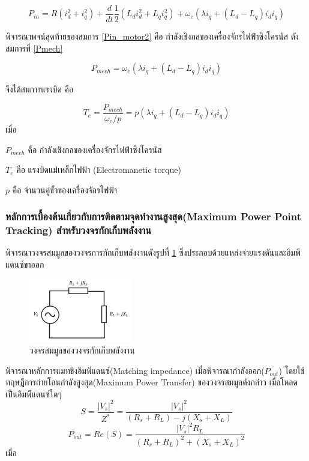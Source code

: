 \documentclass[11pt,a4paper]{article}
\begin{document}
\begin{equation}\label{Pin_motor2}
    P_{in} = R(i_{d}^2 +i_{q}^2) + \frac{d}{dt} \frac{1}{2} (L_{d}i_{d}^2 + L_{q}i_{q}^2) + \omega_{e}(\lambda i_{q} + (L_{d} - L_{q})i_{d}i_{q} )
\end{equation}

พิจารณาพจน์สุดท้ายของสมการ \ref{Pin_motor2} คือ กำลังเชิงกลของเครื่องจักรไฟฟ้าซิงโครนัส ดังสมการที่ \ref{Pmech}

\begin{equation}\label{Pmech}
    P_{mech} =  \omega_{e}(\lambda i_{q} + (L_{d} - L_{q})i_{d}i_{q} )
\end{equation}

จึงได้สมการแรงบิด คือ

\begin{equation}\label{Pmech}
    T_{e} = \frac{P_{mech}}{ \omega_{e}/p } =  p(\lambda i_{q} + (L_{d} - L_{q})i_{d}i_{q} )
\end{equation}
เมื่อ

$P_{mech}$ คือ กำลังเชิงกลของเครื่องจักรไฟฟ้าซิงโครนัส

$T_{e}$ คือ แรงบิดแม่เหล็กไฟฟ้า (Electromanetic torque)

$p$ คือ จำนวนคู่ขั้วของเครื่องจักรไฟฟ้า

\subsubsection{หลักการเบื้องต้นเกี่ยวกับการติดตามจุดทำงานสูงสุด(Maximum Power Point Tracking) สำหรับวงจรกักเก็บพลังงาน}

พิจารณาวงจรสมมูลของวงจรการกักเก็บพลังงานดังรูปที่ \ref{genpath_elec_cir} ซึ่งประกอบด้วยแหล่งจ่ายแรงดันและอิมพีแดนซ์ขาออก
\begin{figure}[H]
    \begin{center}
        \includegraphics[width=0.4\textwidth]{genpath_elec_cir.jpg}
    \end{center}
    \caption{วงจรสมมูลของวงจรกักเก็บพลังงาน \cite{MPPT}}
    \label{genpath_elec_cir}
\end{figure}
พิจารณาหลักการแมทชิงอิมพีแดนซ์(Matching impedance) เมื่อพิจารณากำลังออก($P_{out}$) โดยใช้ทฤษฎีการถ่ายโอนกำลังสูงสุด(Maximum Power Transfer) ของวงจรสมมูลดังกล่าว เมื่อโหลดเป็นอิมพีแดนซ์ใดๆ
\begin{equation}
    S = \frac{|V_{s}|^2 }{ Z^{*} } = \frac{|V_{s}|^2 }{ (R_{s} + R_{L}) - j(X_{s} + X_{L} )  }
\end{equation}
\begin{equation}\label{Pout1}
    P_{out} = Re(S) = \frac{|V_{s}|^2 R_{L} }{ (R_{s} + R_{L})^2 + (X_{s} + X_{L} )^2  }
\end{equation}
เมื่อ
\end{document}
